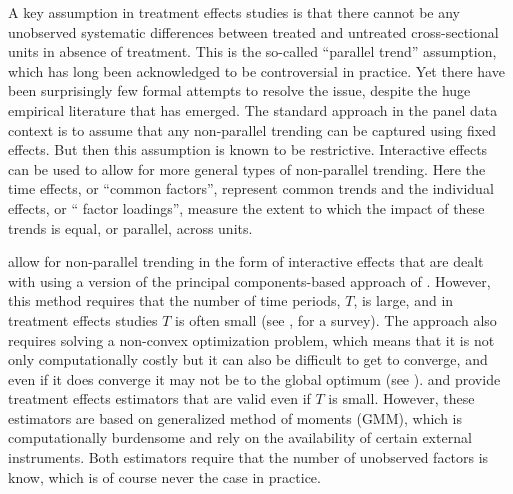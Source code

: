 \documentclass[12pt,fleqn]{article}
\begin{document}
A key assumption in treatment effects studies is that there cannot be any unobserved systematic differences between treated and untreated cross-sectional units in absence of treatment. This is the so-called ``parallel trend'' assumption, which has long been acknowledged to be controversial in practice. Yet there have been surprisingly few formal attempts to resolve the issue, despite the huge empirical literature that has emerged. The standard approach in the panel data context is to assume that any non-parallel trending can be captured using fixed effects. But then this assumption is known to be restrictive. Interactive effects can be used to allow for more general types of non-parallel trending. Here the time effects, or ``common factors'', represent common trends and the individual effects, or `` factor loadings'', measure the extent to which the impact of these trends is equal, or parallel, across units.

\citet{chan2022pcdid} allow for non-parallel trending in the form of interactive effects that are dealt with using a version of the principal components-based approach of \citet{bai2009panel}. However, this method requires that the number of time periods, $T$, is large, and in treatment effects studies $T$ is often small (see \citealp{Bertrand_etal_2004}, for a survey). The approach also requires solving a non-convex optimization problem, which means that it is not only computationally costly but it can also be difficult to get to converge, and even if it does converge it may not be to the global optimum (see \citealp{Moon_Weidner_2019}). \citet{Callaway_Karami_2020} and \citet{brown2022generalized} provide treatment effects estimators that are valid even if $T$ is small. However, these estimators are based on generalized method of moments (GMM), which is computationally burdensome and rely on the availability of certain external instruments. Both estimators require that the number of unobserved factors is know, which is of course never the case in practice.
\end{document}

